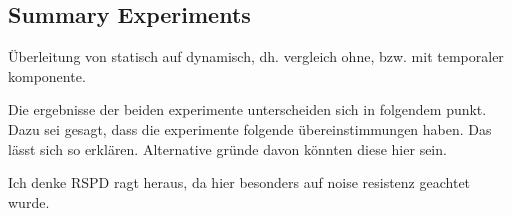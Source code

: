 \documentclass[main.tex]{subfiles}
\begin{document}
\subsection*{Summary Experiments}
Überleitung von statisch auf dynamisch, dh. vergleich ohne, bzw. mit temporaler komponente.

Die ergebnisse der beiden experimente unterscheiden sich in folgendem punkt. Dazu sei gesagt, dass die experimente folgende übereinstimmungen haben.
Das lässt sich so erklären. Alternative gründe davon könnten diese hier sein.

Ich denke RSPD ragt heraus, da hier besonders auf noise resistenz geachtet wurde. %
\end{document}
